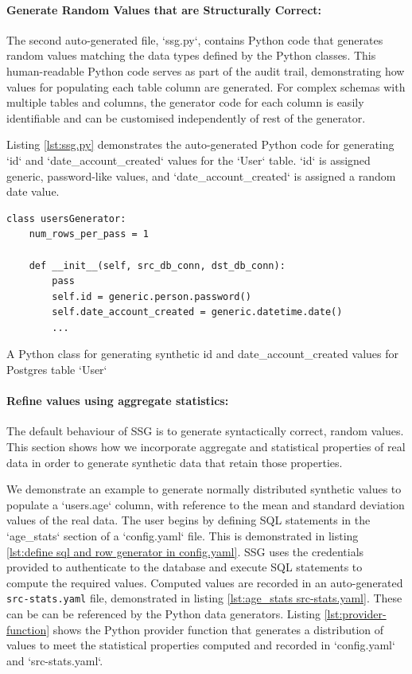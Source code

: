 \documentclass[11pt]{article}
\begin{document}
\paragraph{Generate Random Values that are Structurally Correct: }

The second auto-generated file, `ssg.py`, contains Python code that generates random values matching the data types defined by the Python classes. This human-readable Python code serves as part of the audit trail, demonstrating how values for populating each table column are generated. For complex schemas with multiple tables and columns, the generator code for each column is easily identifiable and can be customised independently of rest of the generator. 

Listing \ref{lst:ssg.py} demonstrates the auto-generated Python code for generating `id` and `date\_account\_created` values for the `User` table. `id` is assigned generic, password-like values, and `date\_account\_created` is assigned a random date value.

\begin{listing}[H]
\begin{verbatim}
class usersGenerator:
    num_rows_per_pass = 1

    def __init__(self, src_db_conn, dst_db_conn):
        pass
        self.id = generic.person.password()
        self.date_account_created = generic.datetime.date()
        ...
\end{verbatim}
\caption{A Python class for generating synthetic id and date\_account\_created values for Postgres table `User`}
\label{lst:ssg.py}
\end{listing}

\paragraph{Refine values using aggregate statistics: }

The default behaviour of SSG is to generate syntactically correct, random values. This section shows how we incorporate aggregate and statistical properties of real data in order to generate synthetic data that retain those properties. 

We demonstrate an example to generate normally distributed synthetic values to populate a `users.age` column, with reference to the mean and standard deviation values of the real data. The user begins by defining SQL statements in the `age\_stats` section of a `config.yaml` file. This is demonstrated in listing \ref{lst:define sql and row generator in config.yaml}. SSG uses the credentials provided to authenticate to the database and execute SQL statements to compute the required values. Computed values are recorded in an auto-generated \texttt{src-stats.yaml} file, demonstrated in listing \ref{lst:age_stats src-stats.yaml}. These can be can be referenced by the Python data generators. Listing \ref{lst:provider-function} shows the Python provider function that generates a distribution of values to meet the statistical properties computed and recorded in `config.yaml` and `src-stats.yaml`.
\end{document}
